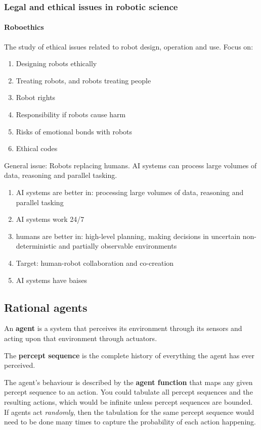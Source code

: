 \subsubsection{Legal and ethical issues in robotic science}

\paragraph{Roboethics} The study of ethical issues related to robot design, operation and use. Focus on:

\begin{enumerate}
	\item Designing robots ethically
	\item Treating robots, and robots treating people
	\item Robot rights
	\item Responsibility if robots cause harm
	\item Risks of emotional bonds with robots
	\item Ethical codes
\end{enumerate}

General issue: Robots replacing humans. AI systems can process large volumes of data, reasoning and parallel tasking.

\begin{enumerate}
	\item AI systems are better in: processing large volumes of data, reasoning and parallel tasking
	\item AI systems work 24/7
	\item humans are better in: high-level planning, making
	decisions in uncertain non-deterministic and
	partially observable environments
	\item Target: human-robot collaboration and co-creation
	\item AI systems have baises
\end{enumerate}

\subsection{Rational agents}
An \textbf{agent}  is a system that perceives its environment through its sensors and acting upon that environment through actuators.

The \textbf{percept sequence} is the complete history of everything the agent has ever perceived.

The agent's behaviour is described by the \textbf{agent function} that maps any given percept sequence to an action. You could tabulate all percept sequences and the resulting actions, which would be infinite unless percept sequences are bounded. If agents act \textit{randomly}, then the tabulation for the same percept sequence would need to be done many times to capture the probability of each action happening.

